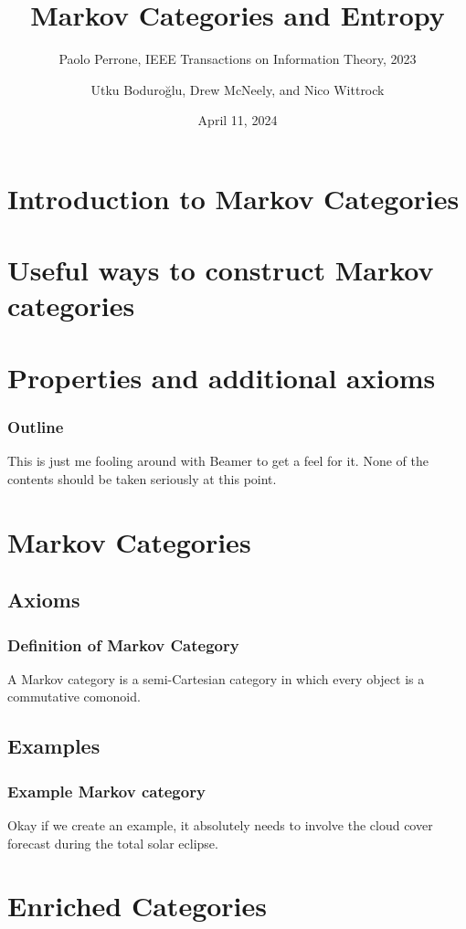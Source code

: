 \documentclass{beamer}
\title{Markov Categories and Entropy}
\subtitle{Paolo Perrone, IEEE Transactions on Information Theory, 2023}
\author{Utku Boduroğlu, Drew McNeely, and Nico Wittrock}
\institute{Adjoint School 2024}
\date{April 11, 2024}
\begin{document}
\begin{frame}
\titlepage
\end{frame}

\section{Introduction to Markov Categories}

\section{Useful ways to construct Markov categories}

\section{Properties and additional axioms}


\begin{frame}
\frametitle{Outline}
This is just me fooling around with Beamer to get a feel for it.
None of the contents should be taken seriously at this point.
\tableofcontents
\end{frame}

\section{Markov Categories}
\subsection{Axioms}

\begin{frame}
\frametitle{Definition of Markov Category}
\begin{definition}
	A Markov category is a semi-Cartesian category in which every object is a commutative comonoid.
\end{definition}
\end{frame}

\subsection{Examples}

\begin{frame}
	\frametitle{Example Markov category}
	Okay if we create an example, it absolutely needs to involve the cloud cover forecast during the total solar eclipse.
\end{frame}

\section{Enriched Categories}
\end{document}
